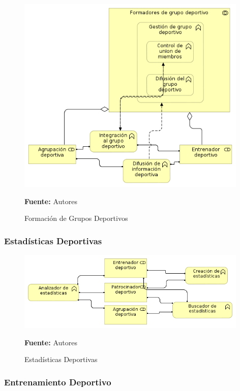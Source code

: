 \begin{figure}[!htb]
  \begin{center}
    \includegraphics[width=11cm]{./imagenes/business_functions/formaciongruposdeportivos.png}
    \caption{Formación de Grupos Deportivos}
    \label{fig:formacion_grupos_deportivos}
    \textbf{Fuente:}  Autores
  \end{center}
\end{figure}

\subsubsection{Estadísticas Deportivas}

\begin{figure}[!htb]
  \begin{center}
    \includegraphics[width=11cm]{./imagenes/business_functions/estadisticasdeportivas.png}
    \caption{Estadísticas Deportivas}
    \label{fig:estadisticas_deportivas}
    \textbf{Fuente:}  Autores
  \end{center}
\end{figure}

\subsubsection{Entrenamiento Deportivo}

